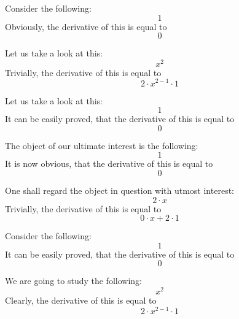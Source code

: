 \documentclass{article}
\begin{document}
Consider the following:
\begin{equation}
1 
\end{equation}
Obviously, the derivative of this is equal to
\begin{equation}
0 
\end{equation}

Let us take a look at this:
\begin{equation}
x ^{2 } 
\end{equation}
Trivially, the derivative of this is equal to
\begin{equation}
2 \cdot x ^{2 - 1 } \cdot 1 
\end{equation}

Let us take a look at this:
\begin{equation}
1 
\end{equation}
It can be easily proved, that the derivative of this is equal to
\begin{equation}
0 
\end{equation}

The object of our ultimate interest is the following:
\begin{equation}
1 
\end{equation}
It is now obvious, that the derivative of this is equal to
\begin{equation}
0 
\end{equation}

One shall regard the object in question with utmost interest:
\begin{equation}
2 \cdot x 
\end{equation}
Trivially, the derivative of this is equal to
\begin{equation}
0 \cdot x + 2 \cdot 1 
\end{equation}

Consider the following:
\begin{equation}
1 
\end{equation}
It can be easily proved, that the derivative of this is equal to
\begin{equation}
0 
\end{equation}

We are going to study the following:
\begin{equation}
x ^{2 } 
\end{equation}
Clearly, the derivative of this is equal to
\begin{equation}
2 \cdot x ^{2 - 1 } \cdot 1 
\end{equation}
\end{document}
